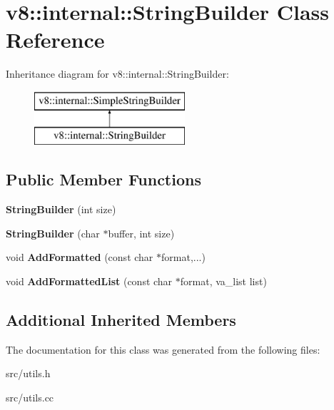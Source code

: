 \hypertarget{classv8_1_1internal_1_1_string_builder}{}\section{v8\+:\+:internal\+:\+:String\+Builder Class Reference}
\label{classv8_1_1internal_1_1_string_builder}
Inheritance diagram for v8\+:\+:internal\+:\+:String\+Builder\+:\begin{figure}[H]
\begin{center}
\leavevmode
\includegraphics[height=2.000000cm]{classv8_1_1internal_1_1_string_builder}
\end{center}
\end{figure}
\subsection*{Public Member Functions}
\begin{DoxyCompactItemize}
\item 
\hypertarget{classv8_1_1internal_1_1_string_builder_a9bf748d9a19f14ade28d2f0d3367d1f7}{}{\bfseries String\+Builder} (int size)\label{classv8_1_1internal_1_1_string_builder_a9bf748d9a19f14ade28d2f0d3367d1f7}

\item 
\hypertarget{classv8_1_1internal_1_1_string_builder_ae084684be6d4361af9a5d1b8de2ff16d}{}{\bfseries String\+Builder} (char $\ast$buffer, int size)\label{classv8_1_1internal_1_1_string_builder_ae084684be6d4361af9a5d1b8de2ff16d}

\item 
\hypertarget{classv8_1_1internal_1_1_string_builder_a85322064ed540cbb1829c27cb82d79cc}{}void {\bfseries Add\+Formatted} (const char $\ast$format,...)\label{classv8_1_1internal_1_1_string_builder_a85322064ed540cbb1829c27cb82d79cc}

\item 
\hypertarget{classv8_1_1internal_1_1_string_builder_a41a43d24e0706c46538530b092be1622}{}void {\bfseries Add\+Formatted\+List} (const char $\ast$format, va\+\_\+list list)\label{classv8_1_1internal_1_1_string_builder_a41a43d24e0706c46538530b092be1622}

\end{DoxyCompactItemize}
\subsection*{Additional Inherited Members}


The documentation for this class was generated from the following files\+:\begin{DoxyCompactItemize}
\item 
src/utils.\+h\item 
src/utils.\+cc\end{DoxyCompactItemize}
